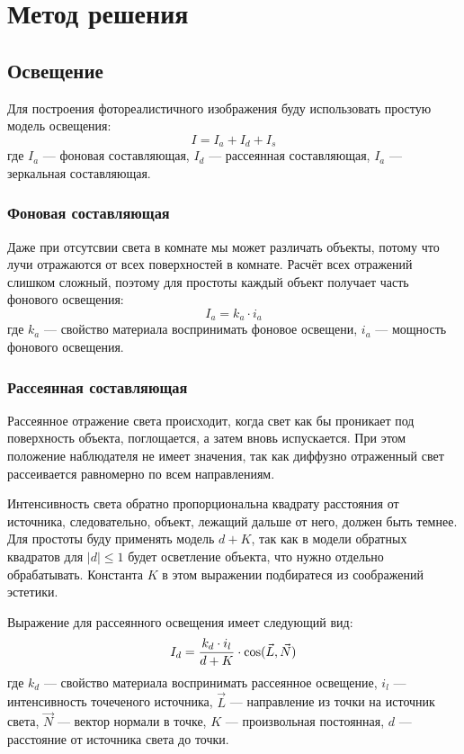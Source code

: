 \section{Метод решения}

\subsection{Освещение}
Для построения фотореалистичного изображения буду использовать простую модель освещения:
$$ I = I_a + I_d + I_s $$
где $I_a$ --- фоновая составляющая, $I_d$ --- рассеянная составляющая, $I_a$ --- зеркальная составляющая.

\subsubsection{Фоновая составляющая}
Даже при отсутсвии света в комнате мы может различать объекты, потому что лучи отражаются от всех поверхностей в комнате. Расчёт всех отражений слишком сложный, поэтому для простоты каждый объект получает часть фонового освещения:
$$ I_a = k_a \cdot i_a $$
где $k_a$ --- свойство материала воспринимать фоновое освещени, $i_a$ --- мощность фонового освещения.

\subsubsection{Рассеянная составляющая}
Рассеянное отражение света происходит, когда свет как бы проникает под поверхность объекта, поглощается, а затем вновь испускается.
При этом положение наблюдателя не имеет значения, так как диффузно отраженный свет рассеивается равномерно по всем направлениям.

Интенсивность света обратно пропорциональна квадрату расстояния от источника, следовательно, объект, лежащий дальше от него, должен быть темнее. Для простоты буду применять модель $d + K$, так как в модели обратных квадратов для $|d| \leqslant 1$ будет осветление объекта, что нужно отдельно обрабатывать. Константа $K$ в этом выражении подбиратеся из соображений эстетики.

Выражение для рассеянного освещения имеет следующий вид:
$$ I_d = {{k_d \cdot i_l} \over {d + K}} \cdot \cos(\vec{L}, \vec{N}) $$
где $k_d$ --- свойство материала воспринимать рассеянное освещение, $i_l$ --- интенсивность точеченого источника, $\vec{L}$ --- направление из точки на источник света, $\vec{N}$ --- вектор нормали в точке, $K$ --- произвольная постоянная, $d$ --- расстояние от источника света до точки.

